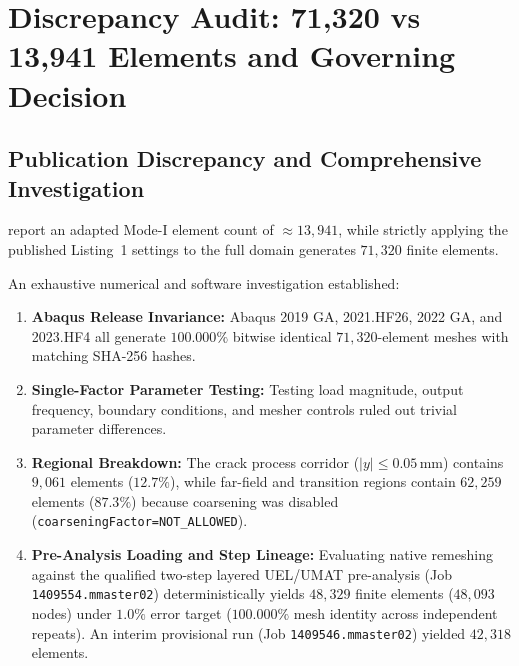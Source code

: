 \section{Discrepancy Audit: 71,320 vs 13,941 Elements and Governing Decision}
\label{sec:discrepancy_audit_71k_vs_14k}

\subsection{Publication Discrepancy and Comprehensive Investigation}
\citet{pandey2025} report an adapted Mode-I element count of $\approx 13{,}941$, while strictly applying the published Listing~1 settings to the full domain generates $71{,}320$ finite elements.

An exhaustive numerical and software investigation established:
\begin{enumerate}
  \item \textbf{Abaqus Release Invariance:} Abaqus 2019 GA, 2021.HF26, 2022 GA, and 2023.HF4 all generate $100.000\%$ bitwise identical $71{,}320$-element meshes with matching SHA-256 hashes.
  \item \textbf{Single-Factor Parameter Testing:} Testing load magnitude, output frequency, boundary conditions, and mesher controls ruled out trivial parameter differences.
  \item \textbf{Regional Breakdown:} The crack process corridor ($|y| \le 0.05\,\mathrm{mm}$) contains $9{,}061$ elements ($12.7\%$), while far-field and transition regions contain $62{,}259$ elements ($87.3\%$) because coarsening was disabled (\texttt{coarseningFactor=NOT\_ALLOWED}).
  \item \textbf{Pre-Analysis Loading and Step Lineage:} Evaluating native remeshing against the qualified two-step layered UEL/UMAT pre-analysis (Job \texttt{1409554.mmaster02}) deterministically yields $48{,}329$ finite elements ($48{,}093$ nodes) under $1.0\%$ error target ($100.000\%$ mesh identity across independent repeats). An interim provisional run (Job \texttt{1409546.mmaster02}) yielded $42{,}318$ elements.
\end{enumerate}

